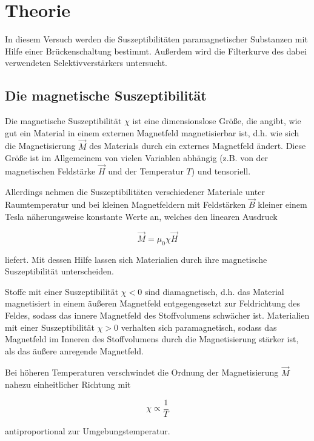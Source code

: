 \section{Theorie}
\label{sec:Theorie}

In diesem Versuch werden die Suszeptibilitäten paramagnetischer Substanzen 
mit Hilfe einer Brückenschaltung bestimmt. Außerdem wird die Filterkurve 
des dabei verwendeten Selektivverstärkers untersucht. 

\subsection{Die magnetische Suszeptibilität}

Die magnetische Suszeptibilität $\chi$ ist eine dimensionslose Größe, die 
angibt, wie gut ein Material in einem externen Magnetfeld magnetisierbar ist,
d.h. wie sich die Magnetisierung $\vec{M}$ des Materials durch ein externes Magnetfeld 
ändert. Diese Größe ist im Allgemeinem von vielen Variablen abhängig (z.B. von der
magnetischen Feldstärke $\vec{H}$ und der Temperatur $T$) und tensoriell.

Allerdings nehmen die Suszeptibilitäten verschiedener Materiale unter Raumtemperatur und bei 
kleinen Magnetfeldern mit Feldstärken $\vec{B}$ kleiner einem Tesla näherungsweise
konstante Werte an, welches den linearen Ausdruck

\begin{equation}
    \vec{M} = \mu_0 \chi \vec{H}
\end{equation}

liefert. Mit dessen Hilfe lassen sich Materialien durch ihre magnetische Suszeptibilität 
unterscheiden. 

Stoffe mit einer Suszeptibilität $\chi < 0$ sind diamagnetisch, d.h. das Material 
magnetisiert in einem äußeren Magnetfeld entgegengesetzt zur Feldrichtung des Feldes,
sodass das innere Magnetfeld des Stoffvolumens schwächer ist.
Materialien mit einer Suszeptibilität $\chi > 0$ verhalten sich paramagnetisch, sodass
das Magnetfeld im Inneren des Stoffvolumens durch die Magnetisierung stärker ist, als 
das äußere anregende Magnetfeld.

Bei höheren Temperaturen verschwindet die Ordnung der Magnetisierung $\vec{M}$ nahezu
einheitlicher Richtung mit

\begin{equation}
    \chi \propto \frac{1}{T}
\end{equation}

antiproportional zur Umgebungstemperatur.

